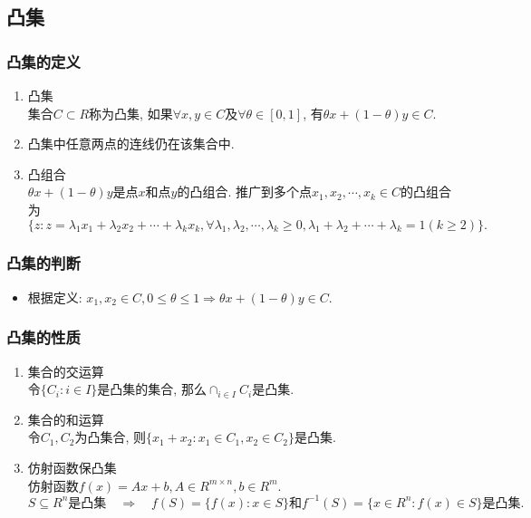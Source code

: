 \documentclass[UTF8]{article}
\begin{document}
\subsection{凸集} 
	
		\subsubsection{凸集的定义}
		\begin{enumerate}
			\item 凸集\\ \quad 集合$C \subset R$称为凸集, 如果$\forall x, y \in C$及$\forall \theta \in [0, 1]$, 有$\theta x + (1 - \theta) y \in C.$
			\item 凸集中任意两点的连线仍在该集合中.
			\item 凸组合\\ \quad  $\theta x + (1 - \theta) y$是点$x$和点$y$的凸组合. 推广到多个点$x_1, x_2, \cdots, x_k \in C$的凸组合为$$\{z : z = \lambda_1 x_1 + \lambda_2 x_2 + \cdots + \lambda_k x_k, \forall \lambda_1, \lambda_2, \cdots, \lambda_k \geq 0, \lambda_1 + \lambda_2 + \cdots + \lambda_k = 1 (k \geq 2)\}.$$
		\end{enumerate}
		\subsubsection{凸集的判断}
		\begin{itemize}
			\item 根据定义: $x_1, x_2 \in C, 0 \leq \theta \leq 1 \Longrightarrow \theta x + (1 - \theta) y \in C.$
		\end{itemize}
		\subsubsection{凸集的性质}
		\begin{enumerate}
			\item 集合的交运算\\ \quad  令$\{C_i : i \in I\}$是凸集的集合, 那么$\cap_{i \in I} C_i$是凸集.
			\item 集合的和运算\\ \quad  令$C_1, C_2$为凸集合, 则$\{x_1 + x_2 : x_1 \in C_1, x_2 \in C_2\}$是凸集.
			\item 仿射函数保凸集\\ \quad 仿射函数$f(x) = A x + b, A \in R^{m \times n}, b \in R^{m}$.
			$$S \subseteq R^{n}\text{是凸集} \quad\Longrightarrow\quad f(S) = \{f(x) : x \in S\}\text{和}f^{-1}(S) = \{x \in R^{n} : f(x) \in S\}\text{是凸集}.$$ 
		\end{enumerate}
\end{document}
